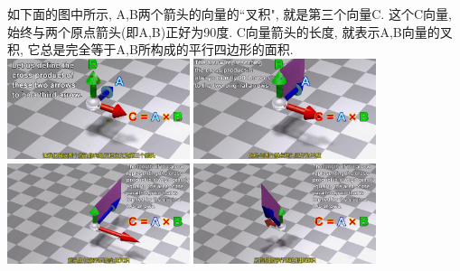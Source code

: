 \documentclass[UTF8]{ctexart}
\begin{document}
\begin{myEnvSample}
	如下面的图中所示, A,B两个箭头的向量的``叉积", 就是第三个向量C. 这个C向量, 始终与两个原点箭头(即A,B)正好为90度.  C向量箭头的长度, 就表示A,B向量的叉积, 它总是完全等于A,B所构成的平行四边形的面积.\\

	\includegraphics[width=0.4\textwidth]{img/0076.png}
	\includegraphics[width=0.4\textwidth]{img/0077.png}\\
	\includegraphics[width=0.4\textwidth]{img/0078.png}
	\includegraphics[width=0.4\textwidth]{img/0079.png}\\
\end{myEnvSample}
\end{document}
